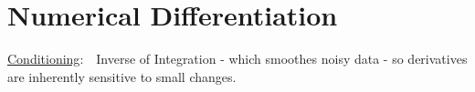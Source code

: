 \documentclass[12pt]{article}
\begin{document}
\newpage
\section{Numerical Differentiation}

\underline{Conditioning}:\ \ {\scriptsize Inverse of Integration - which smoothes noisy data - so %
    derivatives are inherently sensitive to small changes.%
} 
\end{document}
